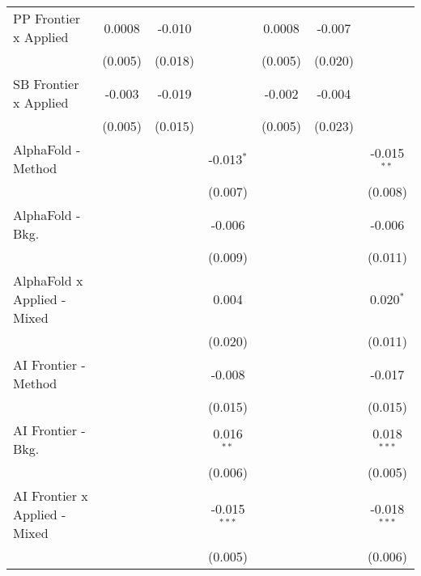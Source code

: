 \begin{tabular}{lcccccc}
   PP Frontier x Applied          & 0.0008       & -0.010       &                & 0.0008         & -0.007      &   \\   
                                  & (0.005)      & (0.018)      &                & (0.005)        & (0.020)     &   \\   
   SB Frontier x Applied          & -0.003       & -0.019       &                & -0.002         & -0.004      &   \\   
                                  & (0.005)      & (0.015)      &                & (0.005)        & (0.023)     &   \\   
   AlphaFold - Method             &              &              & -0.013$^{*}$   &                &             & -0.015$^{**}$\\   
                                  &              &              & (0.007)        &                &             & (0.008)\\   
   AlphaFold - Bkg.               &              &              & -0.006         &                &             & -0.006\\   
                                  &              &              & (0.009)        &                &             & (0.011)\\   
   AlphaFold x Applied - Mixed    &              &              & 0.004          &                &             & 0.020$^{*}$\\   
                                  &              &              & (0.020)        &                &             & (0.011)\\   
   AI Frontier - Method           &              &              & -0.008         &                &             & -0.017\\   
                                  &              &              & (0.015)        &                &             & (0.015)\\   
   AI Frontier - Bkg.             &              &              & 0.016$^{**}$   &                &             & 0.018$^{***}$\\   
                                  &              &              & (0.006)        &                &             & (0.005)\\   
   AI Frontier x Applied - Mixed  &              &              & -0.015$^{***}$ &                &             & -0.018$^{***}$\\   
                                  &              &              & (0.005)        &                &             & (0.006)\\   

\end{tabular}
